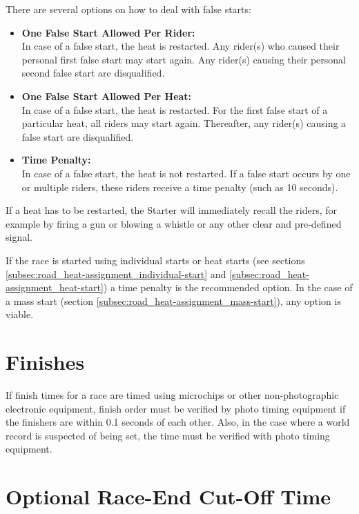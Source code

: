 There are several options on how to deal with false starts:
\begin{itemize}
\item \textbf{One False Start Allowed Per Rider:}\\
In case of a false start, the heat is restarted.
Any rider(s) who caused their personal first false start may start again.
Any rider(s) causing their personal second false start are disqualified.
\item \textbf{One False Start Allowed Per Heat:}\\
In case of a false start, the heat is restarted.
For the first false start of a particular heat, all riders may start again.
Thereafter, any rider(s) causing a false start are disqualified.
\item \textbf{Time Penalty:}\\
In case of a false start, the heat is not restarted.
If a false start occurs by one or multiple riders, these riders receive a time penalty (such as 10 seconds).
\end{itemize}
If a heat has to be restarted, the Starter will immediately recall the riders, for example by firing a gun or blowing a whistle or any other clear and pre-defined signal.

If the race is started using individual starts or heat starts (see sections \ref{subsec:road_heat-assignment_individual-start} and \ref{subsec:road_heat-assignment_heat-start}) a time penalty is the recommended option.
In the case of a mass start (section \ref{subsec:road_heat-assignment_mass-start}), any option is viable.

\section{Finishes}

If finish times for a race are timed using microchips or other non-photographic electronic equipment, finish order must be verified by photo timing equipment if the finishers are within 0.1 seconds of each other.
Also, in the case where a world record is suspected of being set, the time must be verified with photo timing equipment.

\section{Optional Race-End Cut-Off Time}

